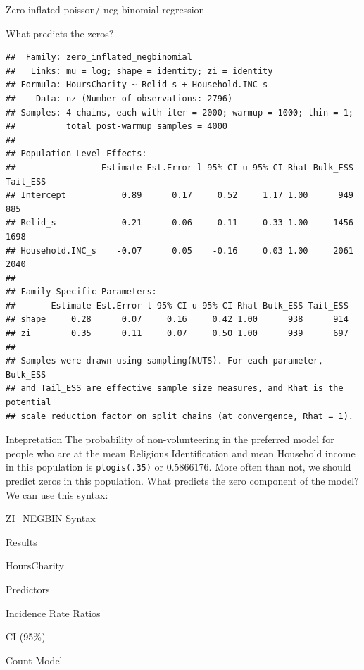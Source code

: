 \documentclass[
  ignorenonframetext,
]{beamer}
\begin{document}
\begin{frame}[fragile]{Zero-inflated poisson/ neg binomial regression}
\begin{block}{What predicts the zeros?}
\protect\hypertarget{what-predicts-the-zeros}{}
\begin{verbatim}
##  Family: zero_inflated_negbinomial 
##   Links: mu = log; shape = identity; zi = identity 
## Formula: HoursCharity ~ Relid_s + Household.INC_s 
##    Data: nz (Number of observations: 2796) 
## Samples: 4 chains, each with iter = 2000; warmup = 1000; thin = 1;
##          total post-warmup samples = 4000
## 
## Population-Level Effects: 
##                 Estimate Est.Error l-95% CI u-95% CI Rhat Bulk_ESS Tail_ESS
## Intercept           0.89      0.17     0.52     1.17 1.00      949      885
## Relid_s             0.21      0.06     0.11     0.33 1.00     1456     1698
## Household.INC_s    -0.07      0.05    -0.16     0.03 1.00     2061     2040
## 
## Family Specific Parameters: 
##       Estimate Est.Error l-95% CI u-95% CI Rhat Bulk_ESS Tail_ESS
## shape     0.28      0.07     0.16     0.42 1.00      938      914
## zi        0.35      0.11     0.07     0.50 1.00      939      697
## 
## Samples were drawn using sampling(NUTS). For each parameter, Bulk_ESS
## and Tail_ESS are effective sample size measures, and Rhat is the potential
## scale reduction factor on split chains (at convergence, Rhat = 1).
\end{verbatim}
\end{block}

\begin{block}{Intepretation}
\protect\hypertarget{intepretation}{}
The probability of non-volunteering in the preferred model for people
who are at the mean Religious Identification and mean Household income
in this population is \texttt{plogis(.35)} or 0.5866176. More often than
not, we should predict zeros in this population. What predicts the zero
component of the model? We can use this syntax:
\end{block}

\begin{block}{ZI\_NEGBIN Syntax}
\protect\hypertarget{zi_negbin-syntax}{}
\end{block}

\begin{block}{Results}
\protect\hypertarget{results-5}{}
~

HoursCharity

Predictors

Incidence Rate Ratios

CI (95\%)

Count Model


\end{block}
\end{frame}
\end{document}
